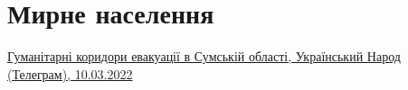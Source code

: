  
 
 
 
 
\section{Мирне населення}

\hyperlink{10_03_2022.tg.ukrainskij_narod.1.gumanitarni_korydory_sumska_oblast}{%
Гуманітарні коридори евакуації в Сумській області, Український Народ (Телеграм), 10.03.2022%
}
